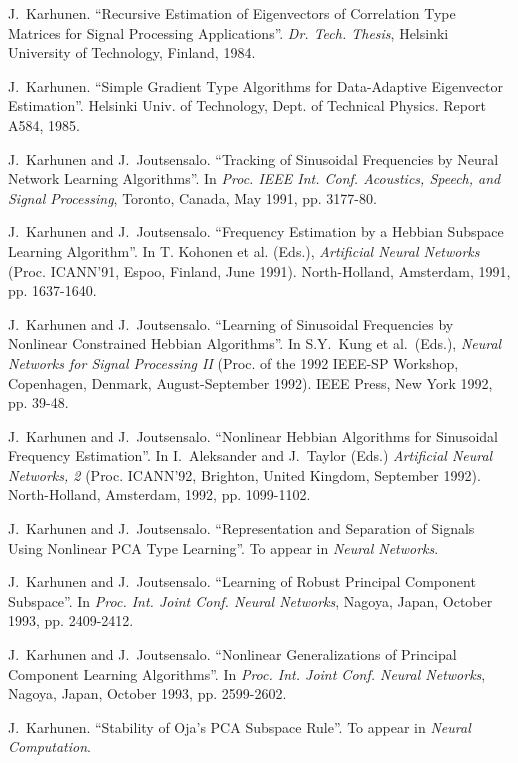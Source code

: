 \begin{thebibliography}{999}
J.~Karhunen.
``Recursive Estimation of Eigenvectors of Correlation Type 
Matrices for Signal Processing Applications''.
{\em Dr. Tech. Thesis}, Helsinki University of Technology, Finland, 1984.

J.~Karhunen.
``Simple Gradient Type Algorithms for Data-Adaptive Eigenvector Estimation''.
Helsinki Univ. of Technology, Dept. of Technical Physics. Report A584, 1985.

J.~Karhunen and J.~Joutsensalo.
``Tracking of Sinusoidal Frequencies by Neural Network Learning Algorithms''.
In {\em Proc. IEEE Int. Conf. Acoustics, Speech, and Signal
Processing}, Toronto, Canada, May 1991, pp. 3177-80. 

J.~Karhunen and J.~Joutsensalo.
``Frequency Estimation by a Hebbian Subspace Learning Algorithm''.
In T. Kohonen et al. (Eds.), {\em Artificial Neural Networks}
(Proc. ICANN'91, Espoo, Finland, June 1991).
North-Holland, Amsterdam, 1991, pp. 1637-1640.

J.~Karhunen and J.~Joutsensalo.
``Learning of Sinusoidal Frequencies by Nonlinear Constrained
Hebbian Algorithms''.
In S.Y.~Kung et al.\ (Eds.), {\em Neural Networks for Signal
Processing II} (Proc. of the 1992 IEEE-SP Workshop, Copenhagen, Denmark,
August-September 1992). IEEE Press, New York 1992, pp. 39-48.

J.~Karhunen and J.~Joutsensalo.
``Nonlinear Hebbian Algorithms for Sinusoidal Frequency Estimation''.
In I.~Aleksander and J.~Taylor (Eds.) {\em Artificial Neural
Networks, 2} (Proc. ICANN'92, Brighton, United Kingdom, September 1992).
North-Holland, Amsterdam, 1992, pp. 1099-1102.

J.~Karhunen and J.~Joutsensalo.
``Representation and Separation of Signals Using Nonlinear
PCA Type Learning''.
To appear in {\em Neural Networks}.

J.~Karhunen and J.~Joutsensalo.
``Learning of Robust Principal Component Subspace''.
In {\em Proc. Int. Joint Conf. Neural Networks}, Nagoya, Japan,
October 1993, pp. 2409-2412.

J.~Karhunen and J.~Joutsensalo.
``Nonlinear Generalizations of Principal Component Learning Algorithms''.
In {\em Proc. Int. Joint Conf. Neural Networks}, Nagoya, Japan,
October 1993, pp. 2599-2602.

J.~Karhunen.
``Stability of Oja's PCA Subspace Rule''.
To appear in {\em Neural Computation}.


\end{thebibliography}
